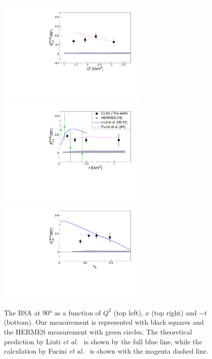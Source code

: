\documentclass[aps,prc,preprint,superscriptaddress]{revtex4}
\begin{document}
\begin{figure}[tbp!]
\center
\includegraphics[width=7.4cm]{ALU_90_p_vs_Q2_shortscenrario.pdf}
\includegraphics[width=7.4cm]{ALU_90_p_vs_t_shortscenrario.pdf}
\includegraphics[width=7.4cm]{ALU_90_p_vs_x_shortscenrario.pdf}
	\caption{The BSA at 90° as a function of  $Q^2$ (top left), $x$ (top right) and 
	$-t$ (bottom). Our measurement is represented with black squares and the HERMES 
	measurement \cite{Airapetian:2009cga} with green circles. The theoretical prediction 
	by Liuti {\it et al.}~\cite{Liuti:2005gi,GonzalezHernandez:2012jv} is shown 
	by the full blue line, while the calculation by Fucini 
	{\it et al.}~\cite{Fucini:2019xlc} is shown with the magenta dashed line.}
\label{fig:IncALU}
\end{figure}
\end{document}
